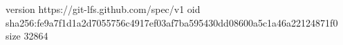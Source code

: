 version https://git-lfs.github.com/spec/v1
oid sha256:fe9a7f1d1a2d7055756c4917ef03af7ba595430dd08600a5c1a46a22124871f0
size 32864
